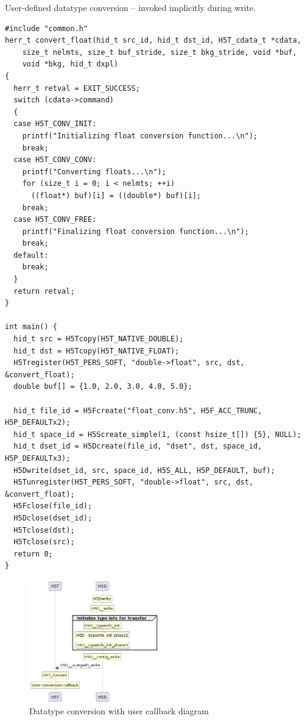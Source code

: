 \begin{listing}
\centering
\caption{User-defined datatype conversion -- invoked implicitly during write.}
\label{lst:ud-datatype-conversion-implicit}
\begin{verbatim}
#include "common.h"
herr_t convert_float(hid_t src_id, hid_t dst_id, H5T_cdata_t *cdata,
    size_t nelmts, size_t buf_stride, size_t bkg_stride, void *buf,
    void *bkg, hid_t dxpl)
{
  herr_t retval = EXIT_SUCCESS;
  switch (cdata->command)
  {
  case H5T_CONV_INIT:
    printf("Initializing float conversion function...\n");
    break;
  case H5T_CONV_CONV:
    printf("Converting floats...\n");
    for (size_t i = 0; i < nelmts; ++i)
      ((float*) buf)[i] = ((double*) buf)[i];
    break;
  case H5T_CONV_FREE:
    printf("Finalizing float conversion function...\n");
    break;
  default:
    break;
  }
  return retval;
}

int main() {
  hid_t src = H5Tcopy(H5T_NATIVE_DOUBLE);
  hid_t dst = H5Tcopy(H5T_NATIVE_FLOAT);
  H5Tregister(H5T_PERS_SOFT, "double->float", src, dst, &convert_float);
  double buf[] = {1.0, 2.0, 3.0, 4.0, 5.0};  
  
  hid_t file_id = H5Fcreate("float_conv.h5", H5F_ACC_TRUNC, H5P_DEFAULTx2);
  hid_t space_id = H5Screate_simple(1, (const hsize_t[]) {5}, NULL);
  hid_t dset_id = H5Dcreate(file_id, "dset", dst, space_id, H5P_DEFAULTx3);
  H5Dwrite(dset_id, src, space_id, H5S_ALL, H5P_DEFAULT, buf);
  H5Tunregister(H5T_PERS_SOFT, "double->float", src, dst, &convert_float);
  H5Fclose(file_id);
  H5Dclose(dset_id);
  H5Tclose(dst);
  H5Tclose(src);
  return 0;
}
\end{verbatim}
\end{listing}

\begin{figure}
    \centering
    \includegraphics[width=0.50\textwidth]{images/tour_5_uml_datatype_conversion.png}
    \caption{Datatype conversion with user callback diagram}
    \label{fig:tour-5-uml-datatype-conversion}
\end{figure}

